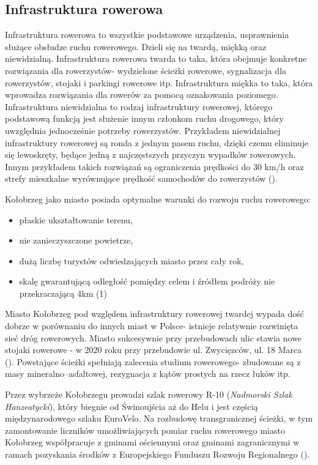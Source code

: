 \documentclass{amuthesis}
\begin{document}
\hypertarget{inf_rower}{%
\subsection{Infrastruktura rowerowa}\label{inf_rower}}

Infrastruktura rowerowa to wszystkie podstawowe urządzenia, usprawnienia służące obsłudze ruchu rowerowego.
Dzieli się na twardą, miękką oraz niewidzialną.
Infrastruktura rowerowa twarda to taka, która obejmuje konkretne rozwiązania dla rowerzystów- wydzielone ścieżki rowerowe, sygnalizacja dla rowerzystów, stojaki i parkingi rowerowe itp.
Infrastruktura miękka to taka, która wprowadza rozwiązania dla rowerów za pomocą oznakowania poziomego.
Infrastruktura niewidzialna to rodzaj infrastruktury rowerowej, którego podstawową funkcją jest służenie innym członkom ruchu drogowego, który uwzględnia jednocześnie potrzeby rowerzystów.
Przykładem niewidzialnej infrastruktury rowerowej są ronda z jednym pasem ruchu, dzięki czemu eliminuje się lewoskręty, będące jedną z najczęstszych przyczyn wypadków rowerowych.
Innym przykładem takich rozwiązań są ograniczenia prędkości do 30 km/h oraz strefy mieszkalne wyrównujące prędkość samochodów do rowerzystów (\textcite{stojaknarower}).

Kołobrzeg jako miasto posiada optymalne warunki do rozwoju ruchu rowerowego:

\begin{itemize}
\item
  płaskie ukształtowanie terenu,
\item
  nie zanieczyszczone powietrze,
\item
  dużą liczbę turystów odwiedzających miasto przez cały rok,
\item
  skalę gwarantującą odległość pomiędzy celem i źródłem podróży nie
  przekraczającą 4km (1)
\end{itemize}

Miasto Kołobrzeg pod względem infrastruktury rowerowej twardej wypada dość dobrze w porównaniu do innych miast w Polsce- istnieje relatywnie rozwinięta sieć dróg rowerowych. Miasto sukcesywnie przy przebudowach ulic stawia nowe stojaki rowerowe - w 2020 roku przy przebudowie ul. Zwycięzców, ul. 18 Marca (\textcite{raport_2020}).
Powstające ścieżki spełniają zalecenia studium rowerowego- zbudowane są z masy mineralno--asfaltowej, rezygnacja z kątów prostych na rzecz łuków itp.

Przez wybrzeże Kołobrzegu prowadzi szlak rowerowy R-10 (\emph{Nadmorski Szlak Hanzeatycki}), który biegnie od Świnoujścia aż do Helu i jest częścią międzynarodowego szlaku EuroVelo. Na rozbudowę transgranicznej ścieżki, w tym zamontowanie liczników umożliwiających pomiar ruchu rowerowego miasto Kołobrzeg współpracuje z gminami ościennymi oraz gminami zagranicznymi w ramach pozyskania środków z Europejskiego Funduszu Rozwoju Regionalnego (\textcite{raport_2019}).
\end{document}
